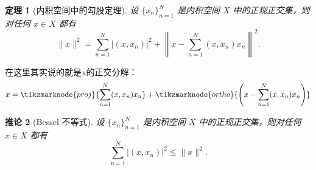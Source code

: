 \documentclass[12pt, a4paper, oneside, fontset=windows]{ctexbook}
\newtheorem{theorem}{定理}[section]
\newtheorem{corollary}[theorem]{推论}
\begin{document}
    \begin{theorem}[内积空间中的勾股定理]
        设 $\{x_n\}_{n=1}^N$ 是内积空间 $X$ 中的正规正交集，则对任何 $x \in X$ 都有
        \[
            \|x\|^2 = \sum_{n=1}^N |( x, x_n )|^2 + \left\|x - \sum_{n=1}^N ( x, x_n ) x_n\right\|^2.
        \]
    \end{theorem}
    \begin{tcolorbox}
        在这里其实说的就是x的正交分解：
        \[
            x = \tikzmarknode{proj}{\sum_{n=1}^N ( x, x_n ) x_n} + \tikzmarknode{ortho}{\left(x - \sum_{n=1}^N ( x, x_n ) x_n\right)}
        \]
        \vspace{3cm} %
        
    \end{tcolorbox}

    \begin{corollary}[Bessel 不等式]
        设 $\{x_n\}_{n=1}^N$ 是内积空间 $X$ 中的正规正交集，则对任何 $x \in X$ 都有
        \[
            \sum_{n=1}^N |( x, x_n )|^2 \le \|x\|^2.
        \]
        \begin{center}
        \end{center}
    \end{corollary}
\end{document}
